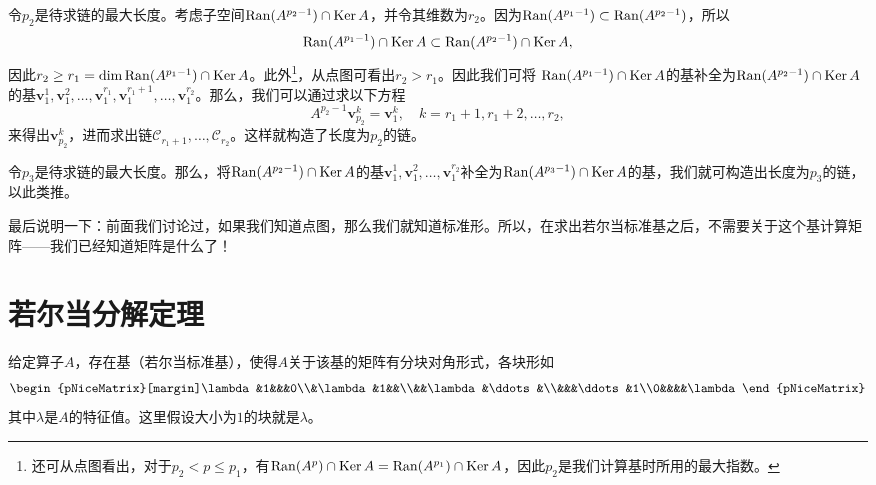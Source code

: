 令$p_2$是待求链的最大长度。考虑子空间$\operatorname{Ran} (A^{p_2-1})\cap\operatorname{Ker} A$，并令其维数为$r_2$。因为$\operatorname{Ran}(A^{p_1-1})\subset \operatorname{Ran}(A^{p_2-1})$，所以
\[\operatorname{Ran}(A^{p_1-1})\cap\operatorname{Ker} A\subset \operatorname{Ran}(A^{p_2-1})\cap\operatorname{Ker} A,\]
因此$r_2\ge r_1=\dim \operatorname{Ran}(A^{p_1-1})\cap\operatorname{Ker} A$。此外\footnote{还可从点图看出，对于$p_2<p\le p_1$，有$\operatorname{Ran}(A^p)\cap\operatorname{Ker} A=\operatorname{Ran}(A^{p_1})\cap\operatorname{Ker} A$，因此$p_2$是我们计算基时所用的最大指数。}，从点图可看出$r_2>r_1$。因此我们可将
$\operatorname{Ran}(A^{p_1-1})\cap\operatorname{Ker} A$的基补全为$\operatorname{Ran}(A^{p_2-1})\cap\operatorname{Ker} A$的基$\mathbf{v}_{1}^{1},\mathbf{v}_{1}^{2},\ldots,\mathbf{v}_{1}^{r_{1}},\mathbf{v}_{1}^{r_{1}+1},\ldots,\mathbf{v}_{1}^{r_{2}}$。那么，我们可以通过求以下方程\[A^{p_2-1}\mathbf{v}_{p_2}^k=\mathbf{v}_1^k,\quad k=r_1+1,r_1+2,\ldots,r_2,\]
来得出$\mathbf{v}_{p_2}^k$，进而求出链$\mathcal{C}_{r_{1}+1},\ldots,\mathcal{C}_{r_{2}}$。这样就构造了长度为$p_2$的链。

令$p_3$是待求链的最大长度。那么，将$\operatorname{Ran}(A^{p_2-1})\cap\operatorname{Ker} A$的基$\mathbf{v}_{1}^{1},$\linebreak $\mathbf{v}_{1}^{2},\ldots,\mathbf{v}_{1}^{r_{2}}$补全为$\operatorname{Ran}(A^{p_3-1})\cap\operatorname{Ker} A$的基，我们就可构造出长度为$p_3$的链，以此类推。


最后说明一下：前面我们讨论过，如果我们知道点图，那么我们就知道标准形。所以，在求出若尔当标准基之后，不需要关于这个基计算矩阵——我们已经知道矩阵是什么了！

\section{若尔当分解定理}

\begin{theorem}\label{thm:jordan_decomp}
    给定算子$A$，存在基（若尔当标准基），使得$A$关于该基的矩阵有分块对角形式，各块形如
    \begin{equation}
        \begin{pNiceMatrix}[margin]\lambda&1&&&0\\&\lambda&1&&\\&&\lambda&\ddots&\\&&&\ddots&1\\0&&&&\lambda\end{pNiceMatrix}
    \end{equation}
    其中$\lambda$是$A$的特征值。这里假设大小为$1$的块就是$\lambda$。
\end{theorem}

